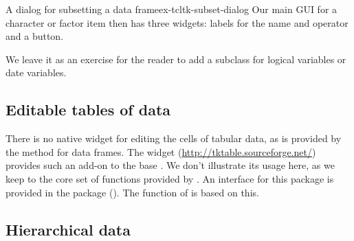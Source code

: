 \begin{example}{A dialog for subsetting a data frame}{ex-tcltk-subset-dialog}
Our main GUI for a character or factor item then has three widgets:
labels for the name and  operator and a button.
\begin{Schunk}
\end{Schunk}


We leave it as an exercise for the reader to add a subclass for
logical variables or date variables.

\end{example}




\subsection{Editable tables of data}
\label{sec:editable-tables-data}

There is no native widget for editing the cells of tabular data, as is
provided by the  method for data frames. The
 widget (\url{http://tktable.sourceforge.net/}) provides
such an add-on to the base \TK. We don't illustrate its usage here, as
we keep to the core set of functions provided by \TK.  An interface
for this \TCL\/ package is provided in the  package
().  The  function of 
is based on this.



\subsection{Hierarchical data}


